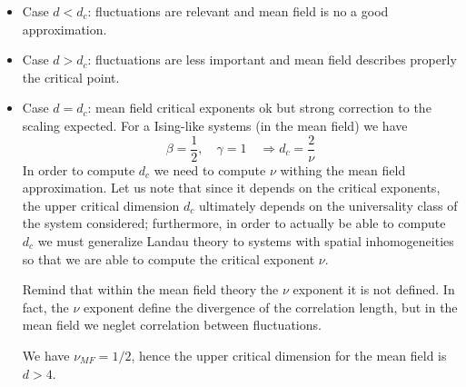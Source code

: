 \documentclass[../../Main/Main.tex]{subfiles}
\begin{document}
\begin{itemize}
\item Case \( d < d_c \): fluctuations are relevant and mean field is no a good approximation.
\item Case \( d > d_c \): fluctuations are less important and mean field describes properly the critical point.
\item Case \( d = d_c \): mean field critical exponents ok but strong correction to the scaling expected. For a Ising-like systems (in the mean field) we have
\begin{equation*}
  \beta = \frac{1}{2}, \quad \gamma =1 \quad \Rightarrow d_c = \frac{2}{\nu}
\end{equation*}
In order to compute \( d_c \) we need to compute \( \nu  \) withing the mean field approximation. Let us note that since it depends on the critical exponents, the upper critical dimension \( d_c \)  ultimately depends on the universality class of the system considered; furthermore, in order to actually be able to compute \( d_c \)  we must generalize Landau theory to systems with spatial inhomogeneities so that we are able to compute the critical exponent \( \nu  \).

\begin{remark}
Remind that within the mean field theory the \( \nu  \) exponent it is not defined. In fact, the \( \nu  \) exponent define the divergence of the correlation length, but in the mean field we neglet correlation between fluctuations.

We have \( \nu _{MF} = 1/2 \), hence the upper critical dimension for the mean field is \( d>4 \).
\end{remark}


\end{itemize}
\end{document}
